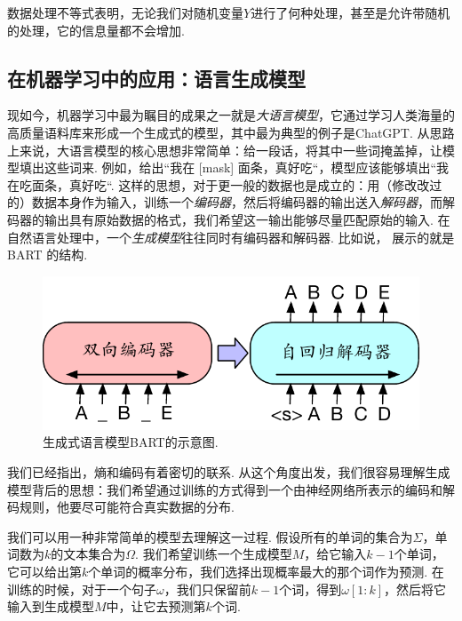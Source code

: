 数据处理不等式表明，无论我们对随机变量$Y$进行了何种处理，甚至是允许带随机的处理，它的信息量都不会增加. 

\subsection{在机器学习中的应用：语言生成模型}
现如今，机器学习中最为瞩目的成果之一就是\emph{大语言模型}，它通过学习人类海量的高质量语料库来形成一个生成式的模型，其中最为典型的例子是ChatGPT. 从思路上来说，大语言模型的核心思想非常简单：给一段话，将其中一些词掩盖掉，让模型填出这些词来. 例如，给出“我在 [mask] 面条，真好吃“，模型应该能够填出“我在吃面条，真好吃“. 这样的思想，对于更一般的数据也是成立的：用（修改改过的）数据本身作为输入，训练一个\emph{编码器}，然后将编码器的输出送入\emph{解码器}，而解码器的输出具有原始数据的格式，我们希望这一输出能够尽量匹配原始的输入. 在自然语言处理中，一个\emph{生成模型}往往同时有编码器和解码器. 比如说， 展示的就是BART  \cite{lewisBARTDenoisingSequencetoSequence2019} 的结构.

\begin{figure}[ht]
    \centering
    \includegraphics[scale=0.6]{Figures/information-theory/bart.pdf}
    \caption{生成式语言模型BART的示意图.}
    \label{fig:autoencoder}
\end{figure}

我们已经指出，熵和编码有着密切的联系. 从这个角度出发，我们很容易理解生成模型背后的思想：我们希望通过训练的方式得到一个由神经网络所表示的编码和解码规则，他要尽可能符合真实数据的分布.

我们可以用一种非常简单的模型去理解这一过程. 假设所有的单词的集合为$\Sigma$，单词数为$k$的文本集合为$\Omega$. 我们希望训练一个生成模型$M$，给它输入$k-1$个单词，它可以给出第$k$个单词的概率分布，我们选择出现概率最大的那个词作为预测. 在训练的时候，对于一个句子$\omega$，我们只保留前$k-1$个词，得到$\omega[1:k]$，然后将它输入到生成模型$M$中，让它去预测第$k$个词. 

